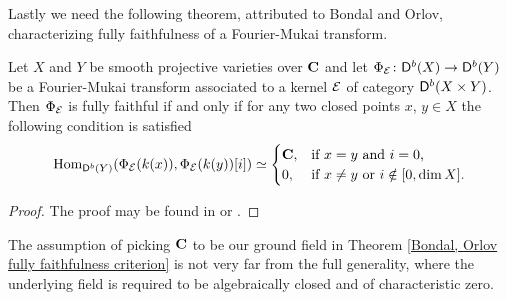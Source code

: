 

Lastly we need the following theorem, attributed to Bondal and Orlov,
characterizing fully faithfulness of a Fourier-Mukai transform.

\begin{theorem}
    \label{Bondal, Orlov fully faithfulness criterion}
    Let $X$ and $Y$ be smooth projective varieties over $\mathbf C$ and let $\Phi_{\mathcal E} \colon \mathsf{D}^b(X) \to \mathsf{D}^b(Y)$ be a Fourier-Mukai transform associated to a kernel $\mathcal E$ of category $\mathsf{D}^b(X \times Y)$. Then $\Phi_{\mathcal E}$ is fully faithful if and only if for any two closed points $x$, $y \in X$ the following condition is satisfied
    \begin{equation}
        \label{eq: Bondal, Orlov conditions}
        \operatorname{Hom}_{\mathsf{D}^b(Y)}(\Phi_{\mathcal E}(k(x)), \Phi_{\mathcal E}(k(y))[i]) \simeq \begin{cases}
            \mathbf C, &\text{if $x = y$ and $i = 0$,} \\
            0, &\text{if $x \neq y$ or $i \notin [0, \dim X]$.}
        \end{cases}
    \end{equation}
\end{theorem}

\begin{proof}
    The proof may be found in \cite[\S 7, Proposition 7.1]{huybrechts2006fouriermukai} or \cite[Theorem 5.1]{bridgeland2019equivalencestriangulatedcategoriesfouriermukai}.
\end{proof}

\begin{remark}        
    The assumption of picking $\mathbf C$ to be our ground field in Theorem \ref{Bondal, Orlov fully faithfulness criterion} is not very far from the full generality, where the underlying field is required to be algebraically closed and of characteristic zero.
\end{remark}

